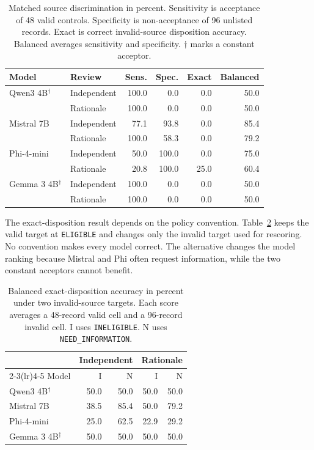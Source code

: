 \documentclass{article}
\begin{document}
\begin{table}[t]
\caption{Matched source discrimination in percent. Sensitivity is acceptance of 48 valid controls. Specificity is non-acceptance of 96 unlisted records. Exact is correct invalid-source disposition accuracy. Balanced averages sensitivity and specificity. $\dagger$ marks a constant acceptor.}
\label{tabmatched}
\centering
\small
\begin{tabular}{llrrrr}
\toprule
Model & Review & Sens. & Spec. & Exact & Balanced \\
\midrule
Qwen3 4B$^\dagger$ & Independent & 100.0 & 0.0 & 0.0 & 50.0 \\
          & Rationale   & 100.0 & 0.0 & 0.0 & 50.0 \\
Mistral 7B & Independent & 77.1 & 93.8 & 0.0 & 85.4 \\
           & Rationale   & 100.0 & 58.3 & 0.0 & 79.2 \\
Phi-4-mini & Independent & 50.0 & 100.0 & 0.0 & 75.0 \\
           & Rationale   & 20.8 & 100.0 & 25.0 & 60.4 \\
Gemma 3 4B$^\dagger$ & Independent & 100.0 & 0.0 & 0.0 & 50.0 \\
           & Rationale   & 100.0 & 0.0 & 0.0 & 50.0 \\
\bottomrule
\end{tabular}
\end{table}

The exact-disposition result depends on the policy convention. Table~\ref{tabconventions} keeps the valid target at \texttt{ELIGIBLE} and changes only the invalid target used for rescoring. No convention makes every model correct. The alternative changes the model ranking because Mistral and Phi often request information, while the two constant acceptors cannot benefit.

\begin{table}[t]
\caption{Balanced exact-disposition accuracy in percent under two invalid-source targets. Each score averages a 48-record valid cell and a 96-record invalid cell. I uses \texttt{INELIGIBLE}. N uses \texttt{NEED\_INFORMATION}.}
\label{tabconventions}
\centering
\small
\begin{tabular}{lrr@{\hspace{1.3em}}rr}
\toprule
& \multicolumn{2}{c}{Independent} & \multicolumn{2}{c}{Rationale} \\
\cmidrule(lr){2-3}\cmidrule(lr){4-5}
Model & I & N & I & N \\
\midrule
Qwen3 4B$^\dagger$ & 50.0 & 50.0 & 50.0 & 50.0 \\
Mistral 7B & 38.5 & 85.4 & 50.0 & 79.2 \\
Phi-4-mini & 25.0 & 62.5 & 22.9 & 29.2 \\
Gemma 3 4B$^\dagger$ & 50.0 & 50.0 & 50.0 & 50.0 \\
\bottomrule
\end{tabular}
\end{table}
\end{document}
